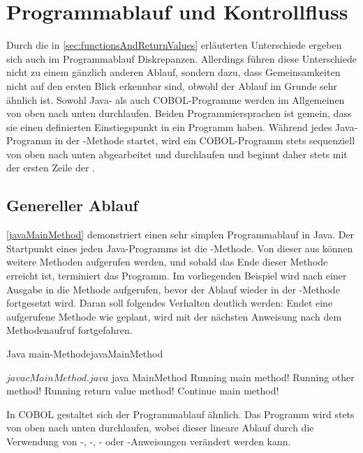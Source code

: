 \section{Programmablauf und Kontrollfluss}\label{programmablauf}
Durch die in \autoref{sec:functionsAndReturnValues} erläuterten Unterschiede ergeben sich auch im Pro\-gramm\-ab\-lauf Diskrepanzen. Allerdings führen diese Unterschiede nicht zu einem gänzlich anderen Ablauf, sondern dazu, dass Gemeinsamkeiten nicht auf den ersten Blick erkennbar sind, obwohl der Ablauf im Grunde sehr ähnlich ist. Sowohl Java- als auch COBOL-Programme werden im Allgemeinen von oben nach unten durchlaufen. Beiden Programmiersprachen ist gemein, dass sie einen definierten Einstiegspunkt in ein Programm haben. Während jedes Java-Programm in der -Methode startet, wird ein COBOL-Programm stets sequenziell von oben nach unten abgearbeitet und durchlaufen und beginnt daher stets mit der ersten Zeile der .

\subsection{Genereller Ablauf} \label{generalablauf}

\autoref{javaMainMethod} demonstriert einen sehr simplen Programmablauf in Java. Der Startpunkt eines jeden Java-Programms ist die -Methode. Von dieser aus können weitere Methoden aufgerufen werden, und sobald das Ende dieser Methode erreicht ist, terminiert das Programm. Im vorliegenden Beispiel wird nach einer Ausgabe in  die Methode  aufgerufen, bevor der Ablauf wieder in der -Methode fortgesetzt wird. Daran soll folgendes Verhalten deutlich werden: Endet eine aufgerufene Methode wie geplant, wird mit der nächsten Anweisung nach dem Methodenaufruf fortgefahren. 

\begin{codeWithCaption}{Java main-Methode}{javaMainMethod}
\begin{shellwindow}
$ javac MainMethod.java 
$ java MainMethod
Running main method!
Running other method!
Running return value method!
Continue main method!
\end{shellwindow}
\end{codeWithCaption}

In COBOL gestaltet sich der Programmablauf ähnlich. Das Programm wird stets von oben nach unten durchlaufen, wobei dieser lineare Ablauf \zB durch die Verwendung von -, -, - oder -Anweisungen verändert werden kann.

